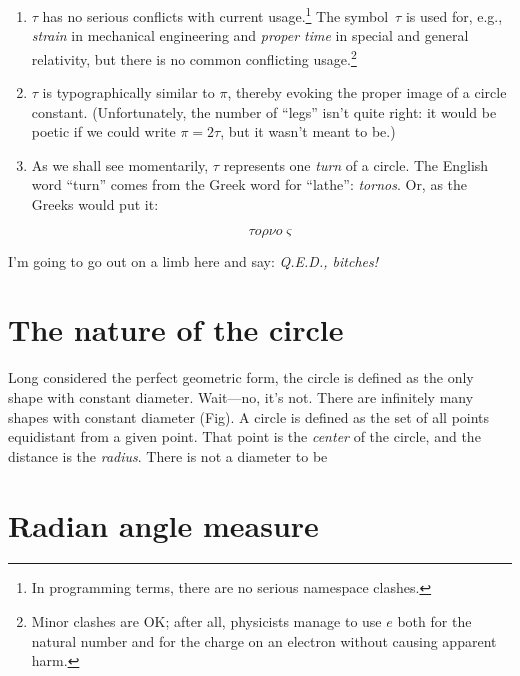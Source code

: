 \documentclass{article}
\begin{document}
\begin{enumerate}
  \item $\tau$ has no serious conflicts with current usage.\footnote{In programming terms, there are no serious namespace clashes.} The symbol~$\tau$ is used for, e.g., \emph{strain} in mechanical engineering and \emph{proper time} in special and general relativity, but there is no common conflicting usage.\footnote{Minor clashes are OK; after all, physicists manage to use $e$ both for the natural number and for the charge on an electron without causing apparent harm.}
  
  \item $\tau$ is typographically similar to $\pi$, thereby evoking the proper image of a circle constant. (Unfortunately, the number of ``legs'' isn't quite right: it would be poetic if we could write $\pi = 2\tau$, but it wasn't meant to be.)
  
  \item As we shall see momentarily, $\tau$ represents one \emph{turn} of a circle. The English word ``turn'' comes from the Greek word for ``lathe'': \emph{tornos}. Or, as the Greeks would put it: 
  
\[ \tau o\rho\nu o\varsigma \]
  
\end{enumerate}

I'm going to go out on a limb here and say: \emph{Q.E.D., bitches!}


\section{The nature of the circle} %
\label{sec:the_nature_of_the_circle}

Long considered the perfect geometric form, the circle is defined as the only shape with constant diameter. Wait---no, it's not. There are infinitely many shapes with constant diameter (Fig). A circle is defined as the set of all points equidistant from a given point. That point is the \emph{center} of the circle, and the distance is the \emph{radius}. There is not a diameter to be


\section{Radian angle measure} %
\label{sec:radian_angle_measure}
\end{document}
